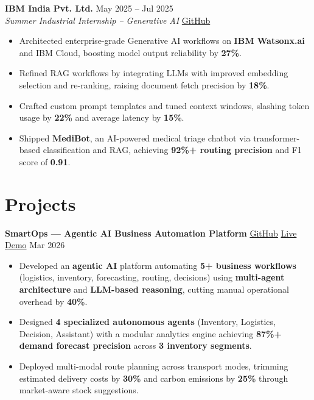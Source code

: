 \documentclass[a4paper,10pt]{article}
\begin{document}
\textbf{IBM India Pvt. Ltd.} \hfill May 2025 -- Jul 2025 \\
\textit{Summer Industrial Internship – Generative AI} \quad
\href{https://github.com/mayankbhagat/Medical_chatbot}{GitHub}
\begin{itemize}[leftmargin=*]
\item Architected enterprise-grade Generative AI workflows on \textbf{IBM Watsonx.ai} and IBM Cloud, boosting model output reliability by \textbf{27\%}.
\item Refined RAG workflows by integrating LLMs with improved embedding selection and re-ranking, raising document fetch precision by \textbf{18\%}.
\item Crafted custom prompt templates and tuned context windows, slashing token usage by \textbf{22\%} and average latency by \textbf{15\%}.
\item Shipped \textbf{MediBot}, an AI-powered medical triage chatbot via transformer-based classification and RAG, achieving \textbf{92\%+ routing precision} and F1 score of \textbf{0.91}.
\end{itemize}


\section*{Projects}

\textbf{SmartOps — Agentic AI Business Automation Platform} \quad
\href{https://github.com/mayankbhagat/smartops}{GitHub} \quad
\href{https://smartops-xuqr.vercel.app/}{Live Demo} \hfill Mar 2026
\begin{itemize}[leftmargin=*]
\item Developed an \textbf{agentic AI} platform automating \textbf{5+ business workflows} (logistics, inventory, forecasting, routing, decisions) using \textbf{multi-agent architecture} and \textbf{LLM-based reasoning}, cutting manual operational overhead by \textbf{40\%}.
\item Designed \textbf{4 specialized autonomous agents} (Inventory, Logistics, Decision, Assistant) with a modular analytics engine achieving \textbf{87\%+ demand forecast precision} across \textbf{3 inventory segments}.
\item Deployed multi-modal route planning across transport modes, trimming estimated delivery costs by \textbf{30\%} and carbon emissions by \textbf{25\%} through market-aware stock suggestions.
\end{itemize}
\end{document}
